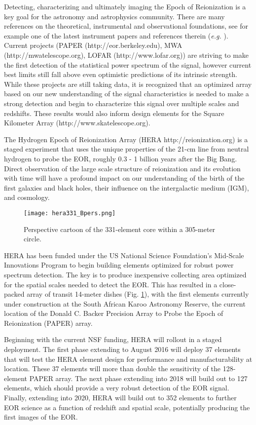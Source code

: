 \documentclass{article}
\begin{document}
Detecting, characterizing and ultimately imaging the Epoch of Reionization is a key goal for the astronomy and astrophysics community. There are many references on the theoretical, instrumental and observational foundations, see for example one of the latest instrument papers and references therein ({\em e.g.} {\cite{2015arXiv150206016A}}).  Current projects (PAPER (http://eor.berkeley.edu), MWA (http://mwatelescope.org), LOFAR (http://www.lofar.org)) are striving to make the first detection of the statistical power spectrum of the signal, however current best limits still fall above even optimistic predictions of its intrinsic strength.  While these projects are still taking data, it is recognized that an optimized array based on our new understanding of the signal characteristics is needed to make a strong detection and begin to characterize this signal over multiple scales and redshifts.  These results would also inform design elements for the Square Kilometer Array (http://www.skatelescope.org).

The Hydrogen Epoch of Reionization Array (HERA http://reionization.org) is a staged experiment that uses the unique properties of the 21-cm line from neutral hydrogen to probe the EOR, roughly 0.3 - 1 billion years after the Big Bang. Direct observation of the large scale structure of reionization and its evolution with time will have a profound impact on our understanding of the birth of the first galaxies and black holes, their influence on the intergalactic medium (IGM), and cosmology.

\begin{figure}[t]
\texttt{[image: hera331\_Bpers.png]}
\caption{Perspective cartoon of the 331-element core within a 305-meter circle.
\label{fig:config}}
\end{figure}

HERA has been funded under the US National Science Foundation's Mid-Scale Innovations Program to begin building elements optimized for robust power spectrum detection.  The key is to produce inexpensive collecting area optimized for the spatial scales needed to detect the EOR.  This has resulted in a close-packed array of transit 14-meter dishes (Fig. \ref{fig:config}), with the first elements currently under construction at the South African Karoo Astronomy Reserve, the current location of the Donald C. Backer Precision Array to Probe the Epoch of Reionization (PAPER) array.

Beginning with the current NSF funding, HERA will rollout in a staged deployment.  The first phase extending to August 2016 will deploy 37 elements that will test the HERA element design for performance and manufacturability at location.  These 37 elements will more than double the sensitivity of the 128-element PAPER array.  The next phase extending into 2018 will build out to 127 elements, which should provide a very robust detection of the EOR signal.  Finally, extending into 2020, HERA will build out to 352 elements to further EOR science as a function of redshift and spatial scale, potentially producing the first images of the EOR.
\end{document}
